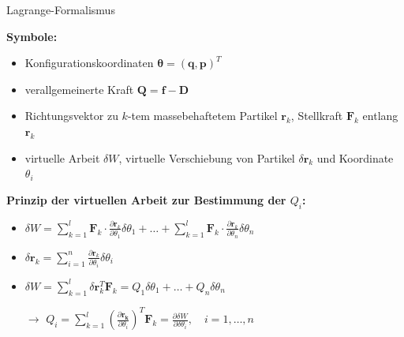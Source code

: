 \documentclass[
	ngerman,
	10pt,				%
	aspectratio=169, 	%
	xcolor=dvipsnames
]{beamer}
\begin{document}
\begin{frame}[t,fragile,label=Lagrange2_2]{\large Lagrange-Formalismus}
	
	\textbf{Symbole:}
	\begin{itemize}
		\item Konfigurationskoordinaten $\boldsymbol{\theta} = (\mathbf{q}, \mathbf{p})^T$
		\item verallgemeinerte Kraft $\mathbf{Q} = \mathbf{f} - \mathbf{D}$
		\pause
		\item Richtungsvektor zu $k$-tem massebehaftetem Partikel $\mathbf{r}_k$, Stellkraft $\mathbf{F}_k$ entlang $\mathbf{r}_k$
		\pause
		\item virtuelle Arbeit $\delta W$, virtuelle Verschiebung von Partikel $\delta \mathbf{r}_k$ und Koordinate $\theta_{i}$
	\end{itemize}
	
	\pause
	\bigskip
	\textbf{Prinzip der virtuellen Arbeit zur Bestimmung der $Q_i$:}
	\begin{itemize}
		\pause
		\item  $\delta W = \sum_{k=1}^l \mathbf{F}_k \cdot \frac{\partial \mathbf{r}_k}{\partial \theta_1} \delta \theta_1 +\ldots + \sum_{k=1}^l \mathbf{F}_k \cdot \frac{\partial \mathbf{r}_k}{\partial \theta_n} \delta \theta_n$
		\pause
		\item $\delta \mathbf{r}_{k} = \sum_{i = 1}^{n} \frac{\partial\mathbf{r}_{k}}{\partial\theta_i} \delta \theta_i$
		\pause
		\item $\delta W = \sum_{k=1}^{l}\delta \mathbf{r}_k^T \mathbf{F}_k = Q_1 \delta \theta_1 + \ldots + Q_n\delta \theta_n$
		\pause
		\item[$\rightarrow$] $Q_i = \sum_{k=1}^l \left(\frac {\partial \mathbf{r_k}} {\partial \theta_i} \right)^T \mathbf {F}_{k} = \frac{\partial\delta W}{\partial \delta \theta_i} ,\quad i=1,\ldots, n$
	\end{itemize}
	
\end{frame}

\end{document}
